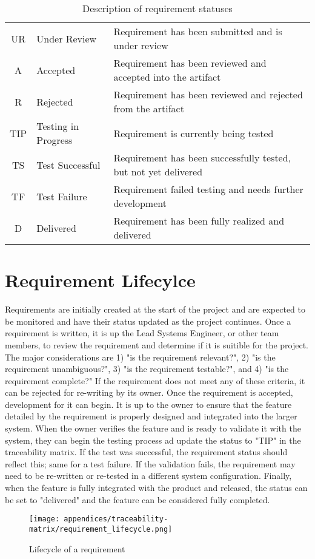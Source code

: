 \begin{table}
    \renewcommand{\arraystretch}{1.5}
    \centering
    \caption{Description of requirement statuses}
    \begin{tabular}{|c | p{} || p{}|}
        \hline
        UR  & Under Review          & Requirement has been submitted and is under review \\
        A   & Accepted              & Requirement has been reviewed and accepted into the artifact \\
        R   & Rejected              & Requirement has been reviewed and rejected from the artifact \\
        TIP & Testing in Progress   & Requirement is currently being tested \\
        TS  & Test Successful       & Requirement has been successfully tested, but not yet delivered \\
        TF  & Test Failure          & Requirement failed testing and needs further development \\
        D   & Delivered             & Requirement has been fully realized and delivered \\
        \hline
    \end{tabular}
\end{table}

\section{Requirement Lifecylce}
Requirements are initially created at the start of the project and are expected to be monitored and have their status updated as the project continues.
Once a requirement is written, it is up the Lead Systems Engineer, or other team members, to review the requirement and determine if it is suitible for the project.
The major considerations are 1) "is the requirement relevant?", 2) "is the requirement unambiguous?", 3) "is the requirement testable?", and 4) "is the requirement complete?"
If the requirement does not meet any of these criteria, it can be rejected for re-writing by its owner.
Once the requirement is accepted, development for it can begin.
It is up to the owner to ensure that the feature detailed by the requirement is properly designed and integrated into the larger system.
When the owner verifies the feature and is ready to validate it with the system, they can begin the testing process ad update the status to "TIP" in the traceability matrix.
If the test was successful, the requirement status should reflect this; same for a test failure.
If the validation fails, the requirement may need to be re-written or re-tested in a different system configuration.
Finally, when the feature is fully integrated with the product and released, the status can be set to "delivered" and the feature can be considered fully completed.

\begin{figure}
    \centering
    \caption{Lifecycle of a requirement}
    \texttt{[image: appendices/traceability-matrix/requirement\_lifecycle.png]}
\end{figure}
